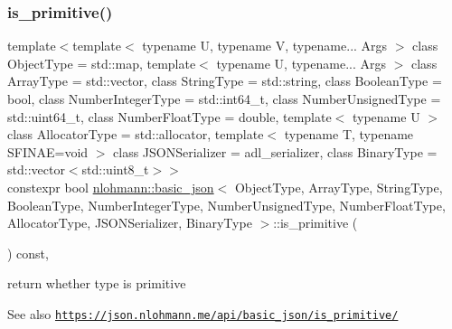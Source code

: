 \subsubsection{\texorpdfstring{is\+\_\+primitive()}{is\_primitive()}}
{\footnotesize\ttfamily template$<$template$<$ typename U, typename V, typename... Args $>$ class Object\+Type = std\+::map, template$<$ typename U, typename... Args $>$ class Array\+Type = std\+::vector, class String\+Type  = std\+::string, class Boolean\+Type  = bool, class Number\+Integer\+Type  = std\+::int64\+\_\+t, class Number\+Unsigned\+Type  = std\+::uint64\+\_\+t, class Number\+Float\+Type  = double, template$<$ typename U $>$ class Allocator\+Type = std\+::allocator, template$<$ typename T, typename S\+F\+I\+N\+A\+E=void $>$ class J\+S\+O\+N\+Serializer = adl\+\_\+serializer, class Binary\+Type  = std\+::vector$<$std\+::uint8\+\_\+t$>$$>$ \\
constexpr bool \hyperlink{classnlohmann_1_1basic__json}{nlohmann\+::basic\+\_\+json}$<$ Object\+Type, Array\+Type, String\+Type, Boolean\+Type, Number\+Integer\+Type, Number\+Unsigned\+Type, Number\+Float\+Type, Allocator\+Type, J\+S\+O\+N\+Serializer, Binary\+Type $>$\+::is\+\_\+primitive (\begin{DoxyParamCaption}{ }\end{DoxyParamCaption}) const\hspace{0.3cm}{\ttfamily [inline]}, {\ttfamily [noexcept]}}



return whether type is primitive 

\begin{DoxySeeAlso}{See also}
\href{https://json.nlohmann.me/api/basic_json/is_primitive/}{\tt https\+://json.\+nlohmann.\+me/api/basic\+\_\+json/is\+\_\+primitive/} 
\end{DoxySeeAlso}
\mbox{\label{classnlohmann_1_1basic__json_ab303d17366c26fca12242c7f8def1bb7}} 
